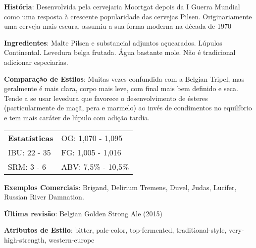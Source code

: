 \textbf{História}: Desenvolvida pela cervejaria Moortgat depois da I Guerra Mundial como uma resposta à crescente popularidade das cervejas Pilsen. Originariamente uma cerveja mais escura, assumiu a sua forma moderna na década de 1970

\textbf{Ingredientes}: Malte Pilsen e substancial adjuntos açucarados. Lúpulos Continental. Levedura belga frutada. Água bastante mole. Não é tradicional adicionar especiarias.

\textbf{Comparação de Estilos}: Muitas vezes confundida com a Belgian Tripel, mas geralmente é mais clara, corpo mais leve, com final mais bem definido e seca. Tende a se usar levedura que favorece o desenvolvimento de ésteres (particularmente de maçã, pera e marmelo) ao invés de condimentos no equilíbrio e tem mais caráter de lúpulo com adição tardia.

\begin{tabular}{@{}p{35mm}p{35mm}@{}}
  \textbf{Estatísticas} & OG: 1,070 - 1,095  \\
  IBU: 22 - 35  & FG: 1,005 - 1,016   \\
  SRM: 3 - 6 & ABV: 7,5\% - 10,5\%
\end{tabular}

\textbf{Exemplos Comerciais}: Brigand, Delirium Tremens, Duvel, Judas, Lucifer, Russian River Damnation.

\textbf{Última revisão}: Belgian Golden Strong Ale (2015)

\textbf{Atributos de Estilo}: bitter, pale-color, top-fermented, traditional-style, very-high-strength, western-europe
